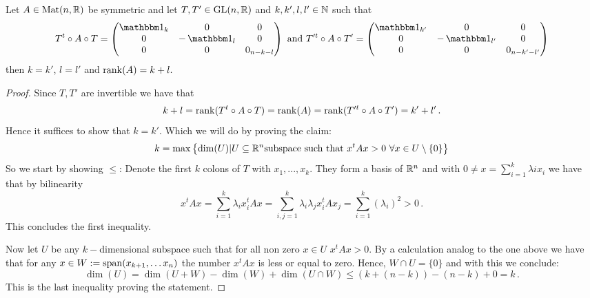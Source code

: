 \begin{theorem}
	Let $A\in \operatorname{\mathrm{Mat}}(n,\mathbb{R})$ be symmetric and let $T,T'\in \mathrm{GL}(n,\mathbb{R})$ and $k,k',l,l'\in \mathbb{N}$ such that \\
	\begin{align*}
		T^t\circ A\circ T=	\begin{pmatrix}
			\Idm_k& 0 &0\\
			0& -\Idm_l&0\\
			0&0&0_{n-k-l}
		\end{pmatrix}\text{ and } 
		T'^t\circ A \circ T'=
		\begin{pmatrix}
			\Idm_{k'}& 0 &0\\
			0& -\Idm_{l'}&0\\
			0&0&0_{n-k'-l'}
		\end{pmatrix}
	\end{align*}
	then $k=k'$, $l=l'$ and $\operatorname{\mathrm{rank}}(A)=k+l.$
\end{theorem}
\begin{proof}
	Since $T,T'$ are invertible we have that
	\begin{align}
		k+l=\operatorname{\mathrm{rank}}(T^t\circ A\circ T)=\operatorname{\mathrm{rank}}(A)=\operatorname{\mathrm{rank}}(T'^t\circ A\circ T')=k'+l' \, .
	\end{align} Hence it suffices to show that $k=k'$. Which we will do by proving the claim:
	\begin{equation*}
		k=\max \left\{ \dim(U)|U\subseteq \mathbb{R}^n \text{subspace such that } x^tAx>0 ~\forall x\in U\setminus \{0\}  \right\}
	\end{equation*}
	So we start by showing \glqq $\leq $\grqq:
	Denote the first $k$ colons of $T$ with $x_1,...,x_k$. They form a basis of $\mathbb{R}^n$ and with $ 0 \neq x=\sum_{i=1}^k\lambda ix_i$ we have that by bilinearity
	\begin{equation}
		x^tAx=\sum_{i=1}^{k}\lambda_i x_i^t A x=\sum_{i,j=1}^{k}\lambda_i \lambda_j x_i^t A x_j=\sum_{i=1}^{k}(\lambda_i)^2 > 0 \,. 
	\end{equation} This concludes the first inequality. 
	
	Now let $U$ be any $k-$dimensional subspace such that for all non zero $x\in U$ $x^tAx>0$. By a calculation analog to the one above we have that for any $x\in W:= \operatorname{\mathrm{span}} (x_{k+1},\dots x_n)$ the number $x^tAx$ is less or equal to zero. Hence, $W\cap U= \{0\}$ and with this we conclude:
	\begin{equation}
		\dim(U)=\dim(U+W)-\dim(W)+\dim(U\cap W)\leq (k+(n-k))-(n-k)+0=k\, .
	\end{equation} This is the last inequality proving the statement.
\end{proof}



